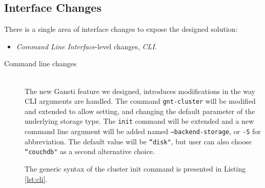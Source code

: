 \subsection{Interface Changes}

There is a single area of interface changes to expose the designed solution:

\begin{itemize}
  \item \emph{Command Line Interface}-level changes, \emph{CLI}.
\end{itemize}

\begin{description}
  \item[Command line changes] \hfill \\
    The new Ganeti feature we designed, introduces modifications in the way CLI
    arguments are handled. The command \texttt{gnt-cluster} will be
    modified and extended to allow setting, and changing the default parameter
    of the underlying storage type. The \texttt{init} command will be extended
    and a new command line argument will be added named
    \texttt{--backend-storage}, or \texttt{-S} for abbreviation. The default
    value will be \texttt{``disk"}, but user can also choose \texttt{``couchdb"}
    as a second alternative choice.

    The generic syntax of the cluster init command is presented in Listing
    \ref{lst:cli}.

    \newpage
\end{description}
